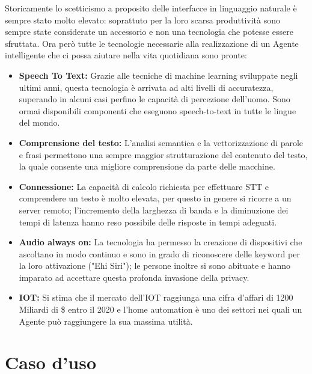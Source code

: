 \documentclass[twoside]{supsistudent}
\begin{document}
Storicamente lo scetticismo a proposito delle interfacce in linguaggio naturale è sempre stato molto elevato: soprattuto per la loro scarsa produttività sono sempre state considerate un accessorio e non una tecnologia che potesse essere sfruttata.
Ora però tutte le tecnologie necessarie alla realizzazione di un Agente intelligente che ci possa aiutare nella vita quotidiana sono pronte:
\begin{itemize}
  \item \textbf{Speech To Text:} Grazie alle tecniche di machine learning sviluppate negli ultimi anni, questa tecnologia è arrivata ad alti livelli di accuratezza, superando in alcuni casi perfino le capacità di percezione dell'uomo. Sono ormai disponibili componenti che eseguono speech-to-text in tutte le lingue del mondo.\cite{sttmachinelearning}
  \item \textbf{Comprensione del testo:} L'analisi semantica e la vettorizzazione di parole e frasi permettono una sempre maggior strutturazione del contenuto del testo, la quale consente una migliore comprensione da parte delle macchine.\cite{word2vec}
  \item \textbf{Connessione:} La capacità di calcolo richiesta per effettuare STT e comprendere un testo è molto elevata, per questo in genere si ricorre a un server remoto; l'incremento della larghezza di banda e la diminuzione dei tempi di latenza hanno reso possibile delle risposte in tempi adeguati.
  \item \textbf{Audio always on:} La tecnologia ha permesso la creazione di dispositivi che ascoltano in modo continuo e sono in grado di riconoscere delle keyword per la loro attivazione ("Ehi Siri"); le persone inoltre si sono abituate e hanno imparato ad accettare questa profonda invasione della privacy.
  \item \textbf{IOT:} Si stima che il mercato dell'IOT raggiunga una cifra d'affari di 1200 Miliardi di \$ entro il 2020 e l'home automation è uno dei settori nei quali un Agente può raggiungere la sua massima utilità.
\end{itemize}

\chapter{Caso d'uso}
\end{document}
